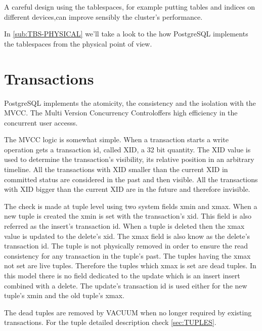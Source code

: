 A careful design using the tablespaces, for example putting tables and indices on different
devices,can improve sensibly the cluster's performance.\newline

In \ref{sub:TBS-PHYSICAL} we'll take a look to the how PostgreSQL implements the tablespaces from the
physical point of view.


\section{Transactions}
\label{sec:TRANSACTION}
PostgreSQL implements the atomicity, the consistency and the isolation with the MVCC.
The Multi Version Concurrency Controloffers high efficiency in
the concurrent user accesss.\newline

The MVCC logic is somewhat simple. When a transaction starts a write operation gets a transaction id,
called XID, a 32 bit quantity. The XID value is used to determine the transaction's
visibility, its relative position in an arbitrary timeline. All the transactions with XID smaller than
the current XID in committed status are considered in the past and then visible. All the transactions
with XID bigger than the current XID are in the future and therefore invisible.\newline

The check is made at tuple level using two system fields xmin and xmax. When a new tuple is created the
xmin is set with the transaction's xid. This field is also referred as the insert's transaction id. When
a tuple is deleted then the xmax value is updated to the delete's xid. The xmax field is also know as
the delete's  transaction id. The tuple is not physically removed in order to ensure the read consistency
for any transaction in the tuple's past. The tuples having the xmax not set are live tuples. Therefore
the tuples which xmax is set are dead tuples. In this model there is no field dedicated to the
update which is an insert insert combined with a delete. The update's transaction id is used either for
the new tuple's xmin and the old tuple's xmax.\newline

The dead tuples are removed by VACUUM when no longer required by existing transactions.
For the tuple detailed description check \ref{sec:TUPLES}.\newline

